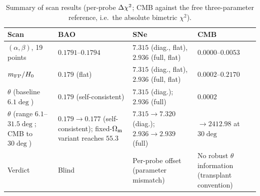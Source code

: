 \begin{table}[H]
\centering\small
\caption{Summary of scan results (per-probe $\Delta\chi^2$; CMB against the free three-parameter \LCDM{} reference, i.e.\ the absolute bimetric $\chi^2$).}\label{tab:scans}
\begin{tabularx}{\textwidth}{@{}l>{\raggedright\arraybackslash}X>{\raggedright\arraybackslash}X>{\raggedright\arraybackslash}X@{}}
\toprule
Scan & BAO & SNe & CMB\\
\midrule
$(\alpha,\beta)$, 19 points & $0.1791$--$0.1794$ & $7.315$ (diag., flat), $2.936$ (full, flat) & $0.0000$--$0.0053$\\
$m_{\mathrm{FP}}/H_0$ & $0.179$ (flat) & $7.315$ (diag., flat), $2.936$ (full, flat) & $0.0002$--$0.2170$\\
$\theta$ (baseline $6.1\deg$) & $0.179$ (self-consistent) & $7.315$ (diag.); $2.936$ (full) & $0.0002$\\
$\theta$ (range $6.1$--$31.5\deg$; CMB to $30\deg$) & $0.179\to0.177$ (self-consistent); fixed-$\Omega_{\mathrm m}$ variant reaches $55.3$ & $7.315\to7.320$ (diag.); $2.936\to2.939$ (full) & $\to2412.98$ at $30\deg$\\
Verdict & Blind & Per-probe offset (parameter mismatch) & No robust $\theta$ information (transplant convention)\\
\bottomrule
\end{tabularx}
\end{table}
